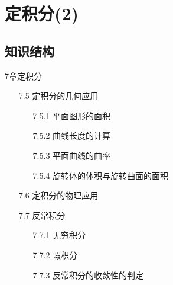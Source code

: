 \documentclass[12pt,UTF8]{ctexart}
\begin{document}
\setcounter{section}{10}
\section{定积分(2)}
\noindent
\subsection{知识结构}
7章定积分
	\begin{enumerate}
		\item[7.5]定积分的几何应用
			\begin{enumerate}
				\item[7.5.1]平面图形的面积
				\item[7.5.2]曲线长度的计算
				\item[7.5.3]平面曲线的曲率
				\item[7.5.4]旋转体的体积与旋转曲面的面积
			\end{enumerate}
		\item[7.6]定积分的物理应用
		\item[7.7]反常积分
			\begin{enumerate}
				\item[7.7.1]无穷积分
				\item[7.7.2]瑕积分
				\item[7.7.3]反常积分的收敛性的判定
			\end{enumerate}
	\end{enumerate}
\end{document}
